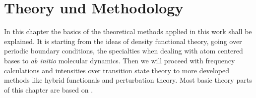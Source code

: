 \documentclass[11pt,DIV=13,BCOR=5mm,a4paper,headinclude]{scrbook}
\begin{document}
\renewcommand{\contentsname}{Contents}
\clearpage
\tableofcontents
\clearpage

\chapter{Theory und Methodology}
In this chapter the basics of the theoretical methods applied in this work shall be explained.
It is starting from the ideas of density functional theory, going over periodic boundary conditions, the specialties when dealing with atom centered bases to \textit{ab initio} molecular dynamics.
Then we will proceed with frequency calculations and intensities over transition state theory to more developed methods like hybrid functionals and perturbation theory.
Most basic theory parts of this chapter are based on \cite{jensen}.
\end{document}
